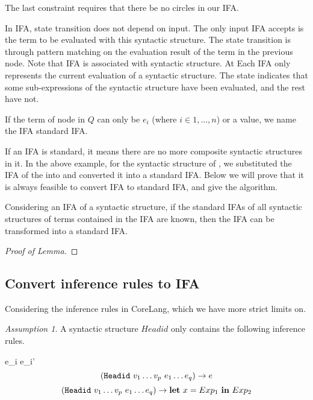 The last constraint requires that there be no circles in our IFA.

In IFA, state transition does not depend on input. The only input IFA accepts is the term to be evaluated with this syntactic structure. The state transition is through pattern matching on the evaluation result of the term in the previous node. Note that IFA is associated with syntactic structure. At Each IFA only represents the current evaluation of a syntactic structure. The state indicates that some
sub-expressions of the syntactic structure have been evaluated, and the rest have not.

\begin{Def}

If the term of node in $Q$ can only be $e_i$ (where $i \in {1,\ldots,n}$) or a value, we name the IFA standard IFA.

\end{Def}

If an IFA is standard, it means there are no more composite syntactic structures in it. In the above example, for the syntactic structure of , we substituted the IFA of the  into  and converted it into a standard IFA. Below we will prove that it is always feasible to convert IFA to standard IFA, and give the algorithm.

\begin{lemma}
Considering an IFA of a syntactic structure, if the standard IFAs of all syntactic structures of terms contained in the IFA are known, then the IFA can be transformed into a standard IFA.
\end{lemma}

\begin{proof}[Proof of Lemma]

\end{proof}

\subsection{Convert inference rules to IFA}

Considering the inference rules in CoreLang, which we have more strict limits on.

\textit{Assumption 1}. A syntactic structure $Headid$ only contains the following inference rules.

{e_i \to e_i'}
\[(\mbox{\tt Headid}~v_1 \ldots v_p~e_1 \ldots e_q) \to e \]
\[(\mbox{\tt Headid}~v_1 \ldots v_p~e_1 \ldots e_q) \to \mbox{\rm \bf let}~x= Exp_1~\mbox{\rm \bf in}~Exp_2 \]

